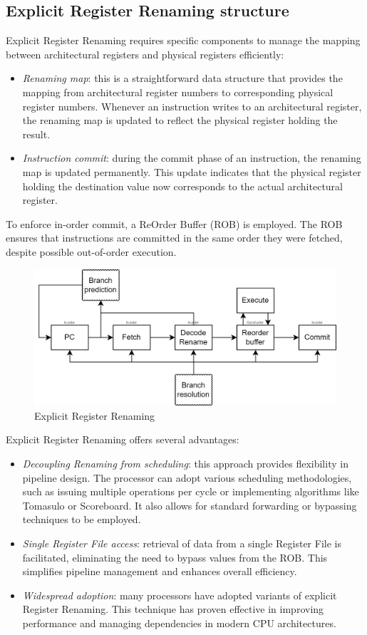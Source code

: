 \subsection{Explicit Register Renaming structure}
Explicit Register Renaming requires specific components to manage the mapping between architectural registers and physical registers efficiently:
\begin{itemize}
    \item \textit{Renaming map}: this is a straightforward data structure that provides the mapping from architectural register numbers to corresponding physical register numbers.
        Whenever an instruction writes to an architectural register, the renaming map is updated to reflect the physical register holding the result.
    \item \textit{Instruction commit}: during the commit phase of an instruction, the renaming map is updated permanently. 
        This update indicates that the physical register holding the destination value now corresponds to the actual architectural register.
\end{itemize}
To enforce in-order commit, a ReOrder Buffer (ROB) is employed. 
The ROB ensures that instructions are committed in the same order they were fetched, despite possible out-of-order execution.
\begin{figure}[H]
    \centering
    \includegraphics[width=0.5\linewidth]{images/herr.png}
    \caption{Explicit Register Renaming}
\end{figure}

Explicit Register Renaming offers several advantages:
\begin{itemize}
    \item \textit{Decoupling Renaming from scheduling}: this approach provides flexibility in pipeline design. 
        The processor can adopt various scheduling methodologies, such as issuing multiple operations per cycle or implementing algorithms like Tomasulo or Scoreboard. 
        It also allows for standard forwarding or bypassing techniques to be employed.
    \item \textit{Single Register File access}: retrieval of data from a single Register File is facilitated, eliminating the need to bypass values from the ROB. 
        This simplifies pipeline management and enhances overall efficiency.
    \item \textit{Widespread adoption}: many processors have adopted variants of explicit Register Renaming.
        This technique has proven effective in improving performance and managing dependencies in modern CPU architectures.
\end{itemize}


